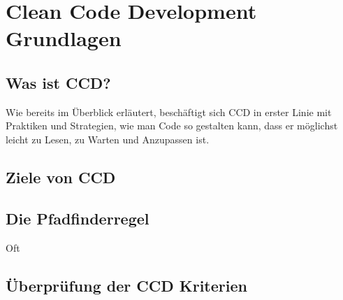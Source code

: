 \chapter{Clean Code Development Grundlagen}
\section{Was ist CCD?}
Wie bereits im Überblick erläutert, beschäftigt sich CCD in erster Linie mit Praktiken und Strategien, wie man Code so gestalten kann, dass er möglichst leicht zu Lesen, zu Warten und Anzupassen ist. 

\section{Ziele von CCD}

\section{Die Pfadfinderregel}
Oft 
\section{Überprüfung der CCD Kriterien}